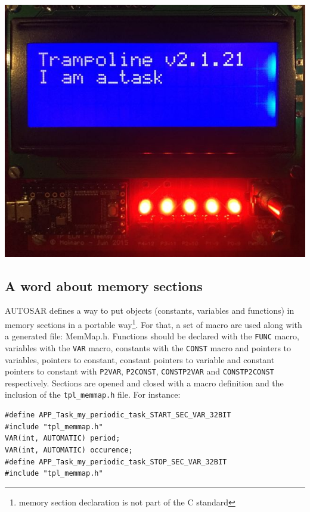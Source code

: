 \documentclass[11pt]{report}
\begin{document}
\begin{center}
   \includegraphics[scale=0.5]{iamatask.jpg}
\end{center}

\subsection{A word about memory sections}

AUTOSAR defines a way to put objects (constants, variables and functions) in memory sections in a portable way\footnote{memory section declaration is not part of the C standard}. For that, a set of macro are used along with a generated file: MemMap.h. Functions should be declared with the \lstinline{FUNC} macro, variables with the \lstinline{VAR} macro, constants with the \lstinline{CONST} macro and pointers to variables, pointers to constant, constant pointers to variable and constant pointers to constant with \lstinline{P2VAR}, \lstinline{P2CONST}, \lstinline{CONSTP2VAR} and \lstinline{CONSTP2CONST} respectively. Sections are opened and closed with a macro definition and the inclusion of the \lstinline{tpl_memmap.h} file. For instance:

\begin{lstlisting}
#define APP_Task_my_periodic_task_START_SEC_VAR_32BIT
#include "tpl_memmap.h"
VAR(int, AUTOMATIC) period;
VAR(int, AUTOMATIC) occurence;
#define APP_Task_my_periodic_task_STOP_SEC_VAR_32BIT
#include "tpl_memmap.h"
\end{lstlisting}
\end{document}
